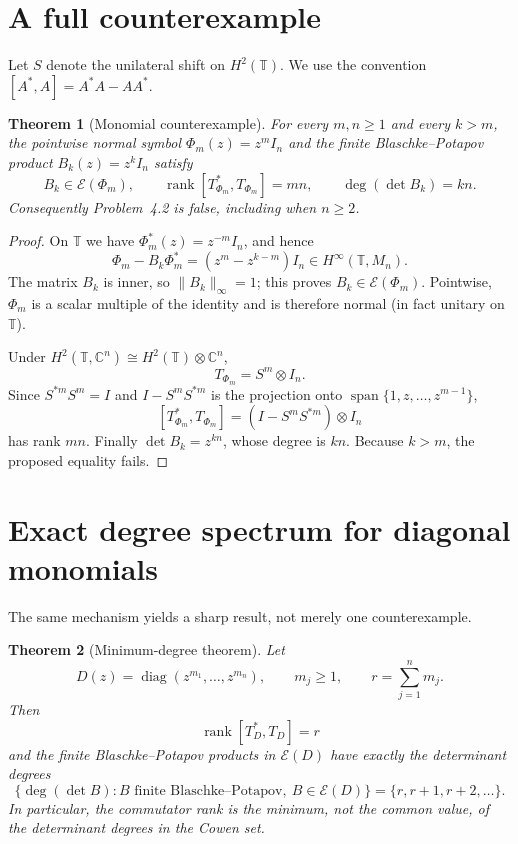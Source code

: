 \documentclass[11pt]{article}
\newtheorem{theorem}{Theorem}
\newcommand{\T}{\mathbb T}
\newcommand{\E}{\mathcal E}
\newcommand{\rank}{\operatorname{rank}}
\newcommand{\diag}{\operatorname{diag}}
\begin{document}
\section{A full counterexample}

Let $S$ denote the unilateral shift on $H^2(\T)$.  We use the convention
$[A^*,A]=A^*A-AA^*$.

\begin{theorem}[Monomial counterexample]\label{thm:counterexample}
For every $m,n\geq1$ and every $k>m$, the pointwise normal symbol
$\Phi_m(z)=z^mI_n$ and the finite Blaschke--Potapov product $B_k(z)=z^kI_n$
satisfy
\[
 B_k\in\E(\Phi_m),\qquad
 \rank[T_{\Phi_m}^*,T_{\Phi_m}]=mn,\qquad
 \deg(\det B_k)=kn.
\]
Consequently Problem~4.2 is false, including when $n\geq2$.
\end{theorem}

\begin{proof}
On $\T$ we have $\Phi_m^*(z)=z^{-m}I_n$, and hence
\[
 \Phi_m-B_k\Phi_m^*=(z^m-z^{k-m})I_n\in H^\infty(\T,M_n).
\]
The matrix $B_k$ is inner, so $\|B_k\|_\infty=1$; this proves
$B_k\in\E(\Phi_m)$.  Pointwise, $\Phi_m$ is a scalar multiple of the identity
and is therefore normal (in fact unitary on $\T$).

Under $H^2(\T,\mathbb C^n)\cong H^2(\T)\otimes\mathbb C^n$,
\[
 T_{\Phi_m}=S^m\otimes I_n.
\]
Since $S^{*m}S^m=I$ and $I-S^mS^{*m}$ is the projection onto
$\operatorname{span}\{1,z,\ldots,z^{m-1}\}$,
\[
 [T_{\Phi_m}^*,T_{\Phi_m}]
   =(I-S^mS^{*m})\otimes I_n
\]
has rank $mn$.  Finally $\det B_k=z^{kn}$, whose degree is $kn$.  Because
$k>m$, the proposed equality fails.
\end{proof}

\section{Exact degree spectrum for diagonal monomials}

The same mechanism yields a sharp result, not merely one counterexample.

\begin{theorem}[Minimum-degree theorem]\label{thm:spectrum}
Let
\[
 D(z)=\diag(z^{m_1},\ldots,z^{m_n}),\qquad m_j\geq1,
 \qquad r=\sum_{j=1}^n m_j.
\]
Then
\[
 \rank[T_D^*,T_D]=r
\]
and the finite Blaschke--Potapov products in $\E(D)$ have exactly the
determinant degrees
\[
 \bigl\{\deg(\det B):B\text{ finite Blaschke--Potapov},\ B\in\E(D)\bigr\}
   =\{r,r+1,r+2,\ldots\}.
\]
In particular, the commutator rank is the \emph{minimum}, not the common
value, of the determinant degrees in the Cowen set.
\end{theorem}
\end{document}
